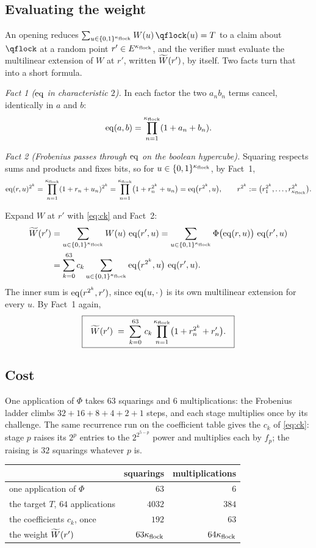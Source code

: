 \subsection{Evaluating the weight}\label{rs:weight}

An opening reduces $\sum_{u\in\cube{\nflock}}W(u)\,\qflock(u)=T$ to a claim about $\qflock$ at a random point $r'\in E^{\kappa_{\mathrm{flock}}}$, and the verifier must evaluate the multilinear extension of $W$ at $r'$, written $\widetilde{W}(r')$, by itself. Two facts turn that into a short formula.

\emph{Fact 1 ($\operatorname{eq}$ in characteristic $2$).} In each factor the two $a_nb_n$ terms cancel, identically in $a$ and $b$:
\[
\operatorname{eq}(a,b)=\prod_{n=1}^{\kappa_{\mathrm{flock}}}(1+a_n+b_n).
\]

\emph{Fact 2 (Frobenius passes through $\operatorname{eq}$ on the boolean hypercube).} Squaring respects sums and products and fixes bits, so for $u\in\{0,1\}^{\kappa_{\mathrm{flock}}}$, by Fact~1,
\[
\operatorname{eq}(r,u)^{2^k}=\prod_{n=1}^{\kappa_{\mathrm{flock}}}(1+r_n+u_n)^{2^k}=\prod_{n=1}^{\kappa_{\mathrm{flock}}}\bigl(1+r_n^{2^k}+u_n\bigr)=\operatorname{eq}\bigl(r^{2^k},u\bigr),
\qquad r^{2^k}:=\bigl(r_1^{2^k},\dots,r_{\kappa_{\mathrm{flock}}}^{2^k}\bigr).
\]

Expand $W$ at $r'$ with \eqref{eq:ck} and Fact~2:
\[
\begin{aligned}
\widetilde{W}(r')&=\sum_{u\in\{0,1\}^{\kappa_{\mathrm{flock}}}}W(u)\,\operatorname{eq}(r',u)
=\sum_{u\in\{0,1\}^{\kappa_{\mathrm{flock}}}}\Phi\bigl(\operatorname{eq}(r,u)\bigr)\,\operatorname{eq}(r',u)\\
&=\sum_{k=0}^{63}c_k\sum_{u\in\{0,1\}^{\kappa_{\mathrm{flock}}}}\operatorname{eq}\bigl(r^{2^k},u\bigr)\,\operatorname{eq}(r',u).
\end{aligned}
\]
The inner sum is $\operatorname{eq}(r^{2^k},r')$, since $\operatorname{eq}(u,\cdot\,)$ is its own multilinear extension for every $u$. By Fact~1 again,
\[
\boxed{\ \
\widetilde{W}(r') \;=\; \sum_{k=0}^{63}\, c_k \prod_{n=1}^{\kappa_{\mathrm{flock}}}
\bigl( 1 + r_n^{2^k} + r'_n \bigr).
\ \ }
\]

\subsection{Cost}\label{rs:cost}

One application of $\Phi$ takes $63$ squarings and $6$ multiplications: the Frobenius ladder climbs $32+16+8+4+2+1$ steps, and each stage multiplies once by its challenge. The same recurrence run on the coefficient table gives the $c_k$ of \eqref{eq:ck}: stage $p$ raises its $2^p$ entries to the $2^{2^{5-p}}$ power and multiplies each by $f_p$; the raising is $32$ squarings whatever $p$ is.

\begin{center}
\begin{tabular}{lrr}
& squarings & multiplications\\[2pt]
\hline
one application of $\Phi$ & $63$ & $6$\\
the target $T$, $64$ applications & $4032$ & $384$\\
the coefficients $c_k$, once & $192$ & $63$\\
the weight $\widetilde{W}(r')$ & $63\kappa_{\mathrm{flock}}$ & $64\kappa_{\mathrm{flock}}$\\
\end{tabular}
\end{center}

